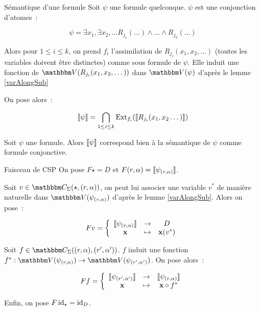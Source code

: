 \begin{defi}{Sémantique d'une formule}\label{cspSem}
    Soit $\psi$ une formule quelconque. $\psi$ est une conjonction d'atomes~:

    \[ \psi = \exists x_1,\exists x_2,\dots
                  R_{j_1}(\dots)\wedge\dots\wedge R_{j_k}(\dots) \]

    Alors pour $1\leq i\leq k$, on prend $f_i$ l'assimilation de
    $R_{j_i}(x_1, x_2, \dots)$ (toutes les variables doivent être distinctes) comme
    sous formule de $\psi$. Elle induit une fonction de $\V(R_{j_i}(x_1, x_2, \dots))$
    dans $\V(\psi)$ d'après le lemme \ref{varAlongSub}

    On pose alors~:

    \[ \llbracket {\psi} \rrbracket = \bigcap_{1\leq i\leq k} \text{Ext}_{f_i}(\llbracket {R_{j_i}(x_1, x_2\dots)} \rrbracket) \]
\end{defi}

\begin{lem}
    Soit $\psi$ une formule. Alors $\llbracket {\psi} \rrbracket$ correspond bien à la sémantique de
    $\psi$ comme formule conjonctive.
\end{lem}


\begin{defi}{Faisceau de CSP}
    On pose $F\star = D$ et $F(r,\alpha) = \llbracket {\psi_{(r,\alpha)}} \rrbracket$.

    Soit $v\in\C_\Sigma(\star, (r,\alpha))$, on peut lui associer une variable
    $v^*$ de manière naturelle dans $\V(\psi_{(r,\alpha)})$ d'après le lemme 
    \ref{varAlongSub}. Alors on pose~:
    
    \[ Fv = \left\{\begin{array}{ccc}
                       \llbracket {\psi_{(r,\alpha)}} \rrbracket & \rightarrow & D              \\
                             \mathbf{x}        & \mapsto     & \mathbf{x}(v^*) \\
    \end{array}\right.\]

    Soit $f\in\C_\Sigma((r,\alpha), (r',\alpha'))$. $f$ induit une fonction
    $f^* : \V(\psi_{(r,\alpha)})\rightarrow\V(\psi_{(r',\alpha')})$. On pose alors~:

    \[ Ff = \left\{\begin{array}{ccc}
                    \llbracket {\psi_{(r',\alpha')}} \rrbracket & \rightarrow & \llbracket {\psi_{(r,\alpha)}} \rrbracket \\
                           \mathbf{x}         & \mapsto     & \mathbf{x} \circ f^* \\
    \end{array}\right.\]

    Enfin, on pose $F\operatorname{id}_\star = \operatorname{id}_D$.
\end{defi}

